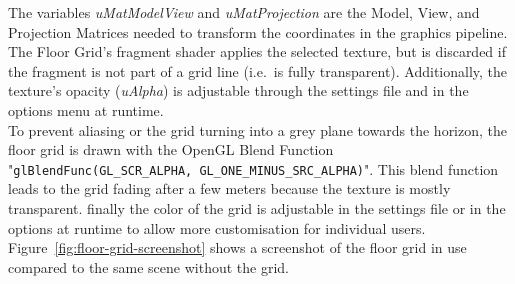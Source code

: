 The variables \textit{uMatModelView} and \textit{uMatProjection} are the Model, View, and Projection Matrices needed
to transform the coordinates in the graphics pipeline.
\\
The Floor Grid's fragment shader applies the selected texture, but is discarded if the fragment is not part of a grid
line (i.e.\ is fully transparent).
Additionally, the texture's opacity (\textit{uAlpha}) is adjustable through the settings file and
in the options menu at runtime.
\\
To prevent aliasing or the grid turning into a grey plane towards the horizon, the floor grid is drawn with the
OpenGL Blend Function "\texttt{glBlendFunc(GL_SCR_ALPHA, GL_ONE_MINUS_SRC_ALPHA)}".
This blend function leads to the grid fading after a few meters because the texture is mostly transparent.
finally the color of the grid is adjustable in the settings file or in the options at runtime to allow more
customisation for individual users.
\\
Figure~\ref{fig:floor-grid-screenshot} shows a screenshot of the floor grid in use compared to the same scene without
the grid.

